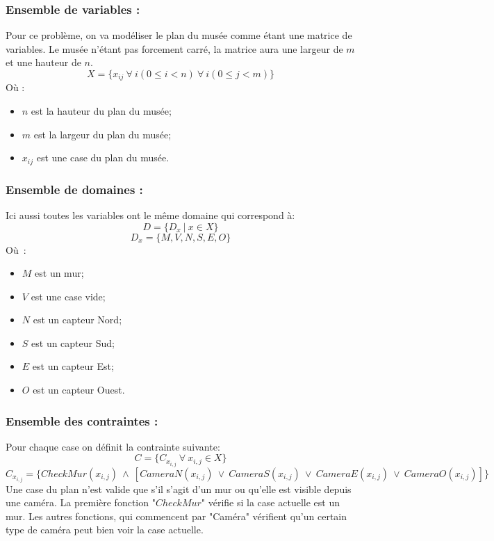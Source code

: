 \documentclass[a4paper,11pt]{article}
\newcommand{\AND}{~\wedge~}
\newcommand{\OR}{~\vee~}
\begin{document}
      \subsubsection{Ensemble de variables :}
          Pour ce problème, on va modéliser le plan du musée comme étant une matrice de variables. Le musée n'étant pas forcement carré, la matrice aura une largeur de $m$ et une hauteur de $n$.
        \label{musee_variable}
        $$X = \{x_{ij}~\forall~i (0 \leq i < n)~\forall~i (0 \leq j < m) \}$$
        Où :
        \begin{itemize}
          \item $n$ est la hauteur du plan du musée;
          \item $m$ est la largeur du plan du musée;
          \item $x_{ij}$ est une case du plan du musée.
        \end{itemize}

      \subsubsection{Ensemble de domaines :}
        Ici aussi toutes les variables ont le même domaine qui correspond à:
        \label{musee_domaine}
        $$D = \{D_{x}~|~x \in X\}$$ 
        $$D_{x} = \{M, V, N, S, E, O\}$$
        Où~:
        \begin{itemize}
          \item $M$ est un mur;
          \item $V$ est une case vide;
          \item $N$ est un capteur Nord;
          \item $S$ est un capteur Sud;
          \item $E$ est un capteur Est;
          \item $O$ est un capteur Ouest.
        \end{itemize}

      \subsubsection{Ensemble des contraintes :}
			Pour chaque case on définit la contrainte suivante:
		  \[C = \{C_{x_{i, j}}~\forall~x_{i, j} \in X\}\]
          \[C_{x_{i, j}} = \{CheckMur(x_{i, j}) \AND [CameraN(x_{i, j}) \OR CameraS(x_{i, j}) \OR CameraE(x_{i, j}) \OR CameraO(x_{i, j})] \}\]
			Une case du plan n'est valide que s'il s'agit d'un mur ou qu'elle est visible depuis une caméra.  La première fonction "$CheckMur$" vérifie si la case actuelle est un mur.  Les autres fonctions, qui commencent par "Caméra" vérifient qu'un certain type de caméra peut bien voir la case actuelle.
\end{document}
